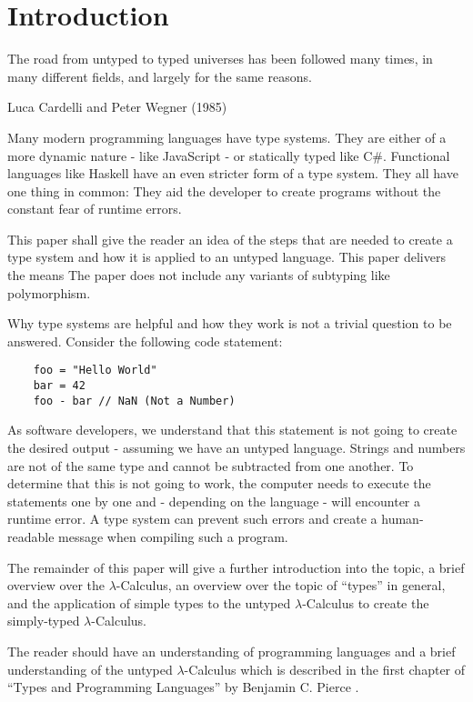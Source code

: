 \section{Introduction}

\epigraph{
    The road from untyped to typed universes has been followed many times,
    in many different fields, and largely for the same reasons.
}
{Luca Cardelli and Peter Wegner (1985)}

Many modern programming languages have type systems.
They are either of a more dynamic nature - like JavaScript -
or statically typed like C\#. Functional languages like Haskell have
an even stricter form of a type system. They all have one thing in
common: They aid the developer to create programs without
the constant fear of runtime errors.

This paper shall give the reader an idea of the steps that
are needed to create a type system and how it is applied to
an untyped language. This paper delivers the means
The paper does not include any variants of subtyping like polymorphism.

Why type systems are helpful and how they work
is not a trivial question to be answered. Consider
the following code statement:

\begin{verbatim}
    foo = "Hello World"
    bar = 42
    foo - bar // NaN (Not a Number)
\end{verbatim}

As software developers, we understand that this statement
is not going to create the desired output - assuming we have an untyped
language. Strings and numbers are not
of the same type and cannot be subtracted from one another. To determine
that this is not going to work, the computer needs to execute
the statements one by one and - depending on the language - will encounter
a runtime error. A type system can prevent such errors and create a
human-readable message when compiling such a program.

The remainder of this paper will give a further introduction into the topic,
a brief overview over the $\lambda$-Calculus, an overview
over the topic of ``types'' in general, and the application
of simple types to the untyped $\lambda$-Calculus to create the
simply-typed $\lambda$-Calculus.

The reader should have an understanding of programming
languages and a brief understanding of the untyped
$\lambda$-Calculus which is described in the first
chapter of ``Types and Programming Languages'' by
Benjamin C. Pierce \cite{pierce2002ProgLang}.
